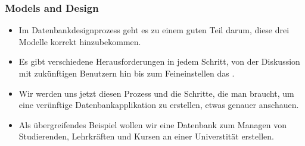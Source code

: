 \documentclass[aspectratio=169,mathserif,notheorems]{beamer}%
\begin{document}
%
\begin{frame}%
\frametitle{Models and Design}%
\begin{itemize}%
\item Im Datenbankdesignprozess geht es zu einem guten Teil darum, diese drei Modelle korrekt hinzubekommen.%
%
\item<2-> Es gibt verschiedene Herausforderungen in jedem Schritt, von der Diskussion mit zukünftigen Benutzern hin bis zum Feineinstellen das .%
%
\item<3-> Wir werden uns jetzt diesen Prozess und die Schritte, die man braucht, um eine verünftige Datenbankapplikation zu erstellen, etwas genauer anschauen.%
%
\item<4-> Als übergreifendes Beispiel wollen wir eine Datenbank zum Managen von Studierenden, Lehrkräften und Kursen an einer Universtität erstellen.%
\end{itemize}%
\end{frame}%
%
\end{document}
